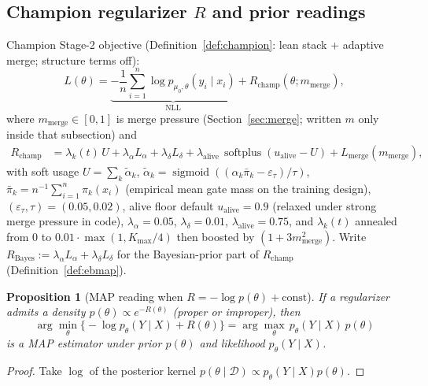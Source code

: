 \documentclass[11pt,a4paper]{article}
\theoremstyle{plain}
\newtheorem{proposition}[theorem]{Proposition}
\theoremstyle{definition}
\theoremstyle{remark}
\newcommand{\D}{\mathcal{D}}
\newcommand{\tht}{\theta}
\newcommand{\sigmoid}{\operatorname{sigmoid}}
\newcommand{\softplus}{\operatorname{softplus}}
\newcommand{\Kmax}{K_{\max}}
\begin{document}
\subsection{Champion regularizer \(R\) and prior readings}
Champion Stage-2 objective (Definition~\ref{def:champion}: lean stack + adaptive merge;
structure terms off):
\begin{equation}
  L(\tht)
  =
  \underbrace{
    -\frac1n\sum_{i=1}^n\log p_{\mu_0,\tht}(y_i\mid x_i)
  }_{\mathrm{NLL}}
  +
  R_{\mathrm{champ}}(\tht;m_{\mathrm{merge}}),
  \label{eq:loss}
\end{equation}
where \(m_{\mathrm{merge}}\in[0,1]\) is merge pressure (Section~\ref{sec:merge}; written
\(m\) only inside that subsection) and
\begin{equation}
  \begin{aligned}
  R_{\mathrm{champ}}
  &=
  \lambda_k(t)\,U
  +
  \lambda_\alpha L_\alpha
  +
  \lambda_\delta L_\delta
  +
  \lambda_{\mathrm{alive}}\,
  \softplus(u_{\mathrm{alive}}-U)
  +
  L_{\mathrm{merge}}(m_{\mathrm{merge}}),
  \end{aligned}
  \label{eq:R}
\end{equation}
with soft usage
\(U=\sum_k\tilde\alpha_k\),
\(\tilde\alpha_k=\sigmoid((\alpha_k\bar\pi_k-\varepsilon_\tau)/\tau)\),
\(\bar\pi_k=n^{-1}\sum_{i=1}^n\pi_k(x_i)\) (empirical mean gate mass on the training
design),
\((\varepsilon_\tau,\tau)=(0.05,0.02)\),
alive floor default \(u_{\mathrm{alive}}=0.9\) (relaxed under strong merge pressure in
code),
\(\lambda_\alpha=0.05\),
\(\lambda_\delta=0.01\),
\(\lambda_{\mathrm{alive}}=0.75\),
and \(\lambda_k(t)\) annealed from \(0\) to \(0.01\cdot\max(1,\Kmax/4)\) then boosted by
\((1+3m_{\mathrm{merge}}^2)\).
Write \(R_{\mathrm{Bayes}}:=\lambda_\alpha L_\alpha+\lambda_\delta L_\delta\) for the
Bayesian-prior part of \(R_{\mathrm{champ}}\) (Definition~\ref{def:ebmap}).

\begin{proposition}[MAP reading when \(R=-\log p(\tht)+\mathrm{const}\)]
\label{prop:map}
If a regularizer admits a density \(p(\tht)\propto e^{-R(\tht)}\) (proper or improper),
then
\[
  \arg\min_\tht\bigl\{-\log p_\tht(Y\mid X)+R(\tht)\bigr\}
  =
  \arg\max_\tht\, p_\tht(Y\mid X)\,p(\tht)
\]
is a MAP estimator under prior \(p(\tht)\) and likelihood \(p_\tht(Y\mid X)\).
\end{proposition}

\begin{proof}
Take \(\log\) of the posterior kernel \(p(\tht\mid\D)\propto p_\tht(Y\mid X)p(\tht)\).
\end{proof}
\end{document}

